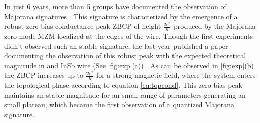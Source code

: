 In just 6 years, more than 5 groups have documented the observation of Majorana signatures \cite{das_zero-bias_2012,deng_anomalous_2012,nadj-perge_observation_2014,deng_majorana_2016,zhang_quantized_2018}. This signature is characterized by the emergence of a robust zero bias conductance peak ZBCP of height $\frac{2e^2}{\hbar}$ produced by the Majorana zero mode MZM localized at the edges of the wire. Though the first experiments didn't observed such an stable signature, the last year \citeauthor{zhang_quantized_2018} published a paper documenting the observation of this robust peak with the expected theoretical magnitude in and InSb wire (See \ref{fig:exp}(a)) . As can be observed in \ref{fig:exp}(b) the ZBCP increases up to $\frac{2e^2}{\hbar}$ for a strong magnetic field, where the system enters the topological phase according to equation \eqref{eq:topcond}. This zero-bias peak maintains an stable magnitude for an small range of parameters generating an small plateau, which became the first observation of a quantized Majorana signature. 



